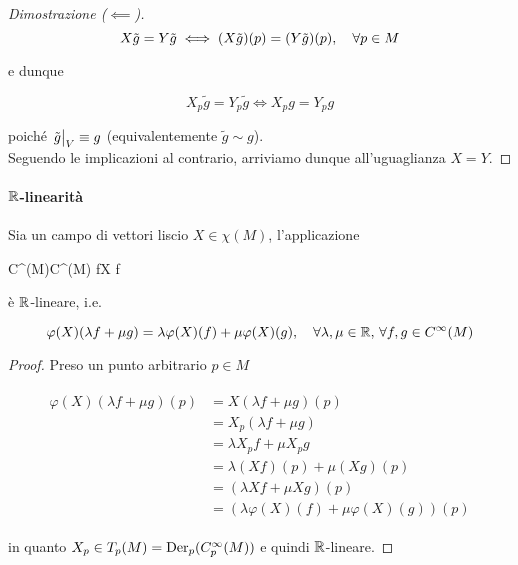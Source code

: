\begin{proof}[Dimostrazione ($ \impliedby $)]
	\begin{equation}
		X \tilde{g} = Y \tilde{g} \iff (X \tilde{g})(p) = (Y \tilde{g})(p) \qcomma \forall p \in M
	\end{equation}

	e dunque
	
	\begin{equation}
		X_{p} \tilde{g} = Y_{p} \tilde{g} \iff X_{p} g = Y_{p} g
	\end{equation}

	poiché $ \eval{\tilde{g}}_{V} \equiv g $ (equivalentemente $ \tilde{g} \sim g $). \\
	Seguendo le implicazioni al contrario, arriviamo dunque all'uguaglianza $ X = Y $.
\end{proof}

\paragraph{$ \mathbb{R} $-linearità}

\begin{definition}
	Sia un campo di vettori liscio $ X \in \chi(M) $, l'applicazione
	
		{C^{\infty}(M)}{C^{\infty}(M)}
		{f}{X f}
	
	è $ \mathbb{R} $-lineare, i.e.
	
	\begin{equation}
		\varphi(X)(\lambda f + \mu g) = \lambda \varphi(X)(f) + \mu \varphi(X)(g) \qcomma \forall \lambda,\mu \in \R, \, \forall f,g \in C^{\infty}(M)
	\end{equation}
\end{definition}

\begin{proof}
	Preso un punto arbitrario $ p \in M $
	
	\begin{align}
		\begin{split}
			\varphi(X)(\lambda f + \mu g)(p) &= X(\lambda f + \mu g)(p) \\
			&= X_{p}(\lambda f + \mu g) \\
			&= \lambda X_{p} f + \mu X_{p} g \\
			&= \lambda (X f)(p) + \mu (X g)(p) \\
			&= (\lambda X f + \mu X g)(p) \\
			&= (\lambda \varphi(X)(f) + \mu \varphi(X)(g))(p)
		\end{split}
	\end{align}

	in quanto $ X_{p} \in T_{p}(M) = \operatorname{Der}_{p}(C_{p}^{\infty}(M)) $ e quindi $ \mathbb{R} $-lineare.
\end{proof}

